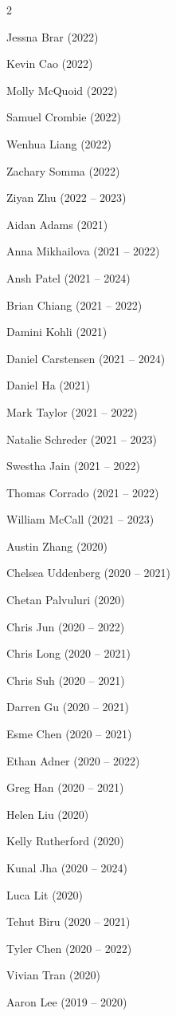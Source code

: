 \documentclass{tufte-book} %
\begin{document}
\begin{fullwidth}
\begin{multicols}{2}
\begin{list}{\quad}{}
\item Jessna Brar (2022)
\item Kevin Cao (2022)
\item Molly McQuoid (2022)
\item Samuel Crombie (2022)
\item Wenhua Liang (2022)
\item Zachary Somma (2022)
\item Ziyan Zhu (2022 -- 2023)
\item Aidan Adams (2021)
\item Anna Mikhailova (2021 -- 2022)
\item Ansh Patel (2021 -- 2024)
\item Brian Chiang (2021 -- 2022)
\item Damini Kohli (2021)
\item Daniel Carstensen (2021 -- 2024)
\item Daniel Ha (2021)
\item Mark Taylor (2021 -- 2022)
\item Natalie Schreder (2021 -- 2023)
\item Swestha Jain (2021 -- 2022)
\item Thomas Corrado (2021 -- 2022)
\item William McCall (2021 -- 2023)
\item Austin Zhang (2020)
\item Chelsea Uddenberg (2020 -- 2021)
\item Chetan Palvuluri (2020)
\item Chris Jun (2020 -- 2022)
\item Chris Long (2020 -- 2021)
\item Chris Suh (2020 -- 2021)
\item Darren Gu (2020 -- 2021)
\item Esme Chen (2020 -- 2021)
\item Ethan Adner (2020 -- 2022)
\item Greg Han (2020 -- 2021)
\item Helen Liu (2020)
\item Kelly Rutherford (2020)
\item Kunal Jha (2020 -- 2024)
\item Luca Lit (2020)
\item Tehut Biru (2020 -- 2021)
\item Tyler Chen (2020 -- 2022)
\item Vivian Tran (2020)
\item Aaron Lee (2019 -- 2020)

\end{list}
\end{multicols}
\end{fullwidth}
\end{document}
